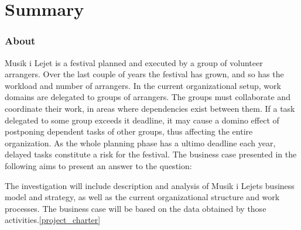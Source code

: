 \part{Summary}

\section{About}
Musik i Lejet is a festival planned and executed by a group of volunteer arrangers. Over the last couple of years the festival has grown, and so has the workload and number of arrangers. In the current organizational setup, work domains are delegated to groups of arrangers. The groups must collaborate and coordinate their work, in areas where dependencies exist between them. If a task delegated to some group exceeds it deadline, it may cause a domino effect of postponing dependent tasks of other groups, thus affecting the entire organization. As the whole planning phase has a ultimo deadline each year, delayed tasks constitute a risk for the festival. The business case presented in the following aims to present an answer to the question:
\vspace{1pt}
\begin{center}
\end{center}
\vspace{1pt}
\noindent
The investigation will include description and analysis of Musik i Lejets business model and strategy, as well as the current organizational structure and work processes. The business case will be based on the data obtained by those activities.\ref{project_charter}

